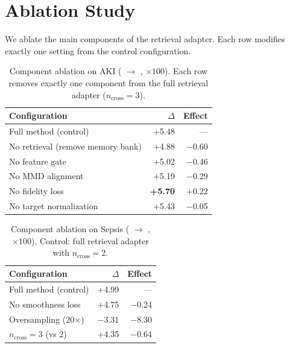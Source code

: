 \section{Ablation Study}
\label{app:ablation}

We ablate the main components of the retrieval adapter.
Each row modifies exactly one setting from the control configuration.

\begin{table}[h]
\centering
\caption{Component ablation on AKI (\eicu{} $\to$ \mimic{}, \aucroc{} $\times 100$). Each row removes exactly one component from the full retrieval adapter ($n_\text{cross}=3$).}
\label{tab:ablation-aki}
\small
\begin{tabular}{@{}lrr@{}}
\toprule
\textbf{Configuration} & \textbf{$\Delta$ \aucroc{}} & \textbf{Effect} \\
\midrule
Full method (control) & +5.48 & --- \\
No retrieval (remove memory bank) & +4.88 & $-$0.60 \\
No feature gate & +5.02 & $-$0.46 \\
No MMD alignment & +5.19 & $-$0.29 \\
No fidelity loss & \textbf{+5.70} & +0.22 \\
No target normalization & +5.43 & $-$0.05 \\
\bottomrule
\end{tabular}
\end{table}

\begin{table}[h]
\centering
\caption{Component ablation on Sepsis (\eicu{} $\to$ \mimic{}, \aucroc{} $\times 100$). Control: full retrieval adapter with $n_\text{cross}=2$.}
\label{tab:ablation-sepsis}
\small
\begin{tabular}{@{}lrr@{}}
\toprule
\textbf{Configuration} & \textbf{$\Delta$ \aucroc{}} & \textbf{Effect} \\
\midrule
Full method (control) & +4.99 & --- \\
No smoothness loss & +4.75 & $-$0.24 \\
Oversampling (20$\times$) & $-$3.31 & $-$8.30 \\
$n_\text{cross}=3$ (vs 2) & +4.35 & $-$0.64 \\
\bottomrule
\end{tabular}
\end{table}

